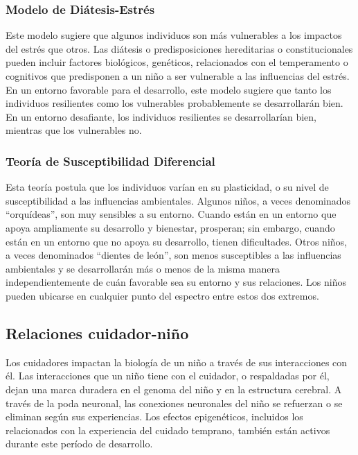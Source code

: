 \documentclass[11pt,letterpaper]{report}
\begin{document}
\subsubsection{Modelo de Diátesis-Estrés}
Este modelo sugiere que algunos individuos son más vulnerables a los impactos
del estrés que otros. Las diátesis o predisposiciones hereditarias o
constitucionales pueden incluir factores biológicos, genéticos, relacionados
con el temperamento o cognitivos que predisponen a un niño a ser vulnerable a
las influencias del estrés. En un entorno favorable para el desarrollo, este
modelo sugiere que tanto los individuos resilientes como los vulnerables
probablemente se desarrollarán bien. En un entorno desafiante, los individuos
resilientes se desarrollarían bien, mientras que los vulnerables no.
\cite{Feldman3}

\subsubsection{Teoría de Susceptibilidad Diferencial}
Esta teoría postula que los individuos varían en su plasticidad, o su nivel de
susceptibilidad a las influencias ambientales. \cite{Belsky2021} Algunos niños,
a veces denominados ``orquídeas'', son muy sensibles a su entorno. Cuando están
en un entorno que apoya ampliamente su desarrollo y bienestar, prosperan; sin
embargo, cuando están en un entorno que no apoya su desarrollo, tienen
dificultades. Otros niños, a veces denominados ``dientes de león'', son menos
susceptibles a las influencias ambientales y se desarrollarán más o menos de la
misma manera independientemente de cuán favorable sea su entorno y sus
relaciones. Los niños pueden ubicarse en cualquier punto del espectro entre
estos dos extremos. \cite{Belsky2021}

\subsection{Relaciones cuidador-niño}
Los cuidadores impactan la biología de un niño a través de sus interacciones con
él. Las interacciones que un niño tiene con el cuidador, o respaldadas por él,
dejan una marca duradera en el genoma del niño y en la estructura cerebral.
A través de la poda neuronal, las conexiones neuronales del niño se refuerzan o
se eliminan según sus experiencias. Los efectos epigenéticos, incluidos los
relacionados con la experiencia del cuidado temprano, también están activos
durante este período de desarrollo. \cite{Roth2011}
\end{document}
